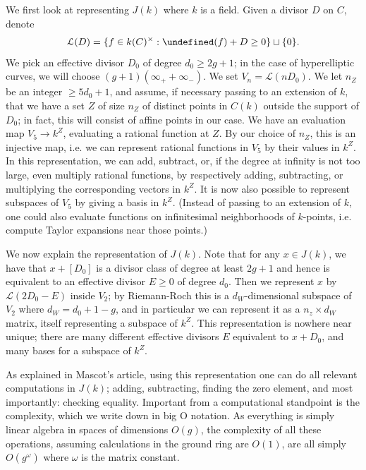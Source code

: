 \documentclass[12pt]{article}
\newcommand{\Lcal}{\mathcal{L}}
\let\div\undefined
\DeclareMathOperator{\div}{div}
\theoremstyle{plain}
\theoremstyle{definition}
\theoremstyle{remark}
\begin{document}
We first look at representing $J(k)$ where $k$ is a field. Given a divisor $D$ on $C$, denote
\[
\Lcal(D) = \{f \in k(C)^\times : \div(f) + D \geq 0 \} \sqcup \{0\}.
\]
We pick an effective divisor $D_0$ of degree $d_0 \geq 2g+1$; in the case of hyperelliptic curves, we will choose $(g+1)(\infty_+ + \infty_-)$. We set $V_n = \Lcal(nD_0)$. We let $n_Z$ be an integer $\geq 5d_0 + 1$, and assume, if necessary passing to an extension of $k$, that we have a set $Z$ of size $n_Z$ of distinct points in $C(k)$ outside the support of $D_0$; in fact, this will consist of affine points in our case. We have an evaluation map $V_5 \to k^Z$, evaluating a rational function at $Z$. By our choice of $n_Z$, this is an injective map, i.e. we can represent rational functions in $V_5$ by their values in $k^Z$. In this representation, we can add, subtract, or, if the degree at infinity is not too large, even multiply rational functions, by respectively adding, subtracting, or multiplying the corresponding vectors in $k^Z$. It is now also possible to represent subspaces of $V_5$ by giving a basis in $k^Z$. (Instead of passing to an extension of $k$, one could also evaluate functions on infinitesimal neighborhoods of $k$-points, i.e. compute Taylor expansions near those points.)

We now explain the representation of $J(k)$. Note that for any $x \in J(k)$, we have that $x + [D_0]$ is a divisor class of degree at least $2g+1$ and hence is equivalent to an effective divisor $E \geq 0$ of degree $d_0$. Then we represent $x$ by $\Lcal(2D_0 - E)$ inside $V_2$; by Riemann-Roch this is a $d_W$-dimensional subspace of $V_2$ where $d_W = d_0 + 1 - g$, and in particular we can represent it as a $n_z \times d_W$ matrix, itself representing a subspace of $k^Z$. This representation is nowhere near unique; there are many different effective divisors $E$ equivalent to $x + D_0$, and many bases for a subspace of $k^Z$.

As explained in Mascot's article, using this representation one can do all relevant computations in $J(k)$; adding, subtracting, finding the zero element, and most importantly: checking equality. Important from a computational standpoint is the complexity, which we write down in big O notation. As everything is simply linear algebra in spaces of dimensions $O(g)$, the complexity of all these operations, assuming calculations in the ground ring are $O(1)$, are all simply $O(g^\omega)$ where $\omega$ is the matrix constant.
\end{document}
